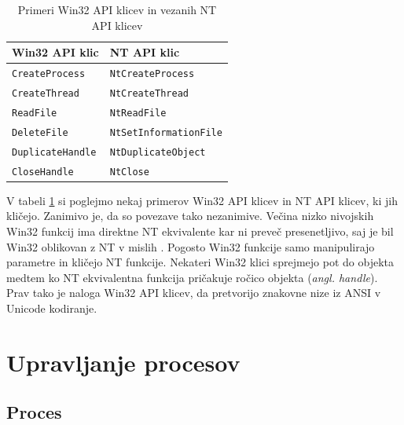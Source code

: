 \documentclass[a4paper,12pt,openright]{book}
\begin{document}
\begin{table}[h!]
	\begin{center}
		\begin{tabular}{ l|l }
			Win32 API klic         & NT API klic                 \\
			\hline
			\verb|CreateProcess|   & \verb|NtCreateProcess|      \\
			\verb|CreateThread|    & \verb|NtCreateThread|       \\
			\verb|ReadFile|        & \verb|NtReadFile|           \\
			\verb|DeleteFile|      & \verb|NtSetInformationFile| \\
			\verb|DuplicateHandle| & \verb|NtDuplicateObject|    \\
			\verb|CloseHandle|     & \verb|NtClose|              \\
		\end{tabular}
	\end{center}
	\caption{Primeri Win32 API klicev in vezanih NT API klicev \cite{Tanenbaum_Bos_2023}}
	\label{tab:example_win32_nt_mapping}
\end{table}

V tabeli \ref{tab:example_win32_nt_mapping} si poglejmo nekaj primerov Win32 API klicev in NT API klicev, ki jih kličejo.
Zanimivo je, da so povezave tako nezanimive.
Večina nizko nivojskih Win32 funkcij ima direktne NT ekvivalente kar ni preveč presenetljivo, saj je bil Win32 oblikovan z NT v mislih \cite{Tanenbaum_Bos_2023}.
Pogosto Win32 funkcije samo manipulirajo parametre in kličejo NT funkcije.
Nekateri Win32 klici sprejmejo pot do objekta medtem ko NT ekvivalentna funkcija pričakuje ročico objekta (\textit{angl. handle}).
Prav tako je naloga Win32 API klicev, da pretvorijo znakovne nize iz ANSI v Unicode kodiranje.


\chapter{Upravljanje procesov}

\section{Proces}
\end{document}
